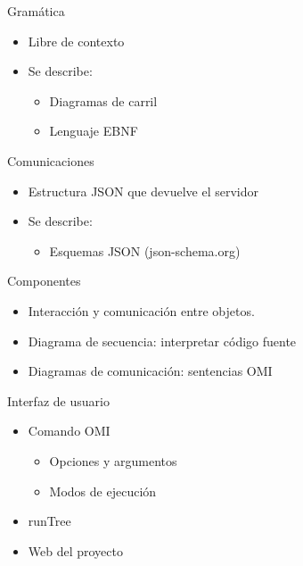 \documentclass[spanish]{beamer}
\begin{document}
\begin{frame}{Gramática}
   \begin{itemize}
         \item Libre de contexto
         \item Se describe:
         \begin{itemize}
            \item Diagramas de carril
            \item Lenguaje EBNF
         \end{itemize}
   \end{itemize}
\end{frame}

\begin{frame}{Comunicaciones}
   \begin{itemize}
         \item Estructura JSON que devuelve el servidor 
         \item Se describe:
         \begin{itemize}
            \item Esquemas JSON (json-schema.org)
         \end{itemize}
   \end{itemize}
\end{frame}

\begin{frame}{Componentes}
   \begin{itemize}
         \item Interacción y comunicación entre objetos.
         \item Diagrama de secuencia: interpretar código fuente
         \item Diagramas de comunicación: sentencias OMI 
   \end{itemize}
\end{frame}

\begin{frame}{Interfaz de usuario}
   \begin{itemize}
         \item Comando OMI
         \begin {itemize}
            \item Opciones y argumentos
            \item Modos de ejecución
         \end{itemize}
         \item runTree
         \item Web del proyecto 
   \end{itemize}
\end{frame}
\end{document}
